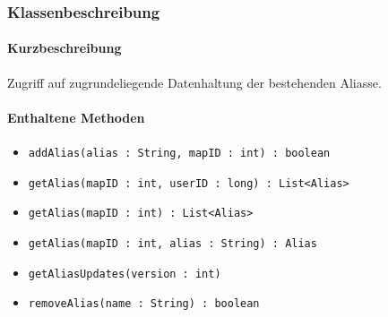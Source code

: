 \subsubsection*{Klassenbeschreibung}%
\paragraph*{Kurzbeschreibung}
Zugriff auf zugrundeliegende Datenhaltung der bestehenden Aliasse.
\paragraph*{Enthaltene Methoden}
\begin{itemize}
    \item \texttt{addAlias(alias : String, mapID : int) : boolean}
    \item \texttt{getAlias(mapID : int, userID : long) : List<Alias>}
    \item \texttt{getAlias(mapID : int) : List<Alias>}
    \item \texttt{getAlias(mapID : int, alias : String) : Alias}
    \item \texttt{getAliasUpdates(version : int)}
    \item \texttt{removeAlias(name : String) : boolean}
\end{itemize}
